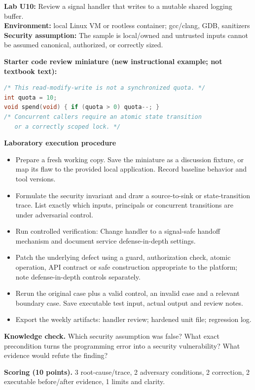 \documentclass[10pt,letterpaper]{article}
\begin{document}
\begin{insight}\textbf{Lab U10:} Review a signal handler that writes to a mutable shared logging buffer.\\\textbf{Environment:} local Linux VM or rootless container; gcc/clang, GDB, sanitizers\\\textbf{Security assumption:} The sample is local/owned and untrusted inputs cannot be assumed canonical, authorized, or correctly sized.\end{insight}
\textbf{Starter code review miniature (new instructional example; not textbook text):}
\begin{lstlisting}[language=C]
/* This read-modify-write is not a synchronized quota. */
int quota = 10;
void spend(void) { if (quota > 0) quota--; }
/* Concurrent callers require an atomic state transition
   or a correctly scoped lock. */
\end{lstlisting}
\textbf{Laboratory execution procedure}
\begin{itemize}[leftmargin=*,itemsep=2pt]
\item Prepare a fresh working copy. Save the miniature as a discussion fixture, or map its flaw to the provided local application. Record baseline behavior and tool versions.
\item Formulate the security invariant and draw a source-to-sink or state-transition trace. List exactly which inputs, principals or concurrent transitions are under adversarial control.
\item Run controlled verification: Change handler to a signal-safe handoff mechanism and document service defense-in-depth settings.
\item Patch the underlying defect using a guard, authorization check, atomic operation, API contract or safe construction appropriate to the platform; note defense-in-depth controls separately.
\item Rerun the original case plus a valid control, an invalid case and a relevant boundary case. Save executable test input, actual output and review notes.
\item Export the weekly artifacts: handler review; hardened unit file; regression log.
\end{itemize}
\textbf{Knowledge check.} Which security assumption was false? What exact precondition turns the programming error into a security vulnerability? What evidence would refute the finding?

\textbf{Scoring (10 points).} 3 root-cause/trace, 2 adversary conditions, 2 correction, 2 executable before/after evidence, 1 limits and clarity.
\end{document}
